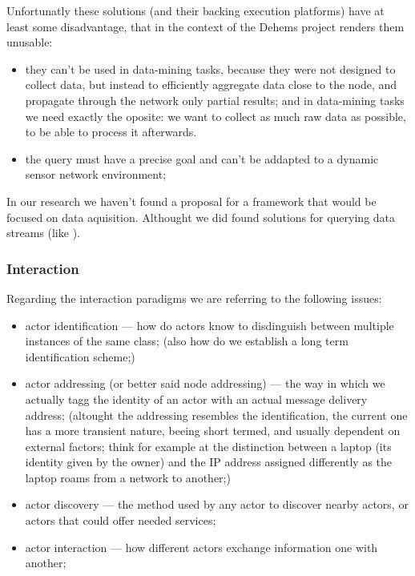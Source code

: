 Unfortunatly these solutions (and their backing execution platforms) have at least some disadvantage, that in the context of the Dehems project renders them unusable:
\begin{itemize}
	\item they can't be used in data-mining tasks, because they were not designed to collect data, but instead to efficiently aggregate data close to the node, and propagate through the network only partial results; and in data-mining tasks we need exactly the oposite: we want to collect as much raw data as possible, to be able to process it afterwards.
	\item the query must have a precise goal and can't be addapted to a dynamic sensor network environment;
\end{itemize}

In our research we haven't found a proposal for a framework that would be focused on data aquisition. Althought we did found solutions for querying data streams (like \cite{Madden2002}).

	\subsubsection{Interaction}

Regarding the interaction paradigms we are referring to the following issues:

\begin{itemize}
	\item actor identification --- how do actors know to disdinguish between multiple instances of the same class; (also how do we establish a long term identification scheme;)
	\item actor addressing (or better said node addressing) --- the way in which we actually tagg the identity of an actor with an actual message delivery address; (altought the addressing resembles the identification, the current one has a more transient nature, beeing short termed, and usually dependent on external factors; think for example at the distinction between a laptop (its identity given by the owner) and the IP address assigned differently as the laptop roams from a network to another;)
	\item actor discovery --- the method used by any actor to discover nearby actors, or actors that could offer needed services;
	\item actor interaction --- how different actors exchange information one with another;
\end{itemize}

